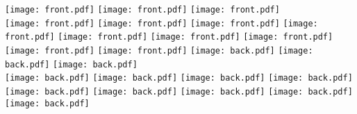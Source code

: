 \documentclass{article}
\begin{document}
 \noindent\texttt{[image: front.pdf]}
 \hspace{10mm}
 \texttt{[image: front.pdf]}
 \hspace{10mm}
 \texttt{[image: front.pdf]} \\
 \texttt{[image: front.pdf]}
 \hspace{10mm}
 \texttt{[image: front.pdf]}
 \hspace{10mm}
 \texttt{[image: front.pdf]}
 \texttt{[image: front.pdf]}
 \hspace{10mm}
 \texttt{[image: front.pdf]}
 \hspace{10mm}
 \texttt{[image: front.pdf]}
 \texttt{[image: front.pdf]}
 \hspace{10mm}
 \texttt{[image: front.pdf]}
 \hspace{10mm}
 \texttt{[image: front.pdf]}
\clearpage
 \noindent\texttt{[image: back.pdf]}
 \hspace{10mm}
 \texttt{[image: back.pdf]}
 \hspace{10mm}
 \texttt{[image: back.pdf]} \\
 \texttt{[image: back.pdf]}
 \hspace{10mm}
 \texttt{[image: back.pdf]}
 \hspace{10mm}
 \texttt{[image: back.pdf]}
 \texttt{[image: back.pdf]}
 \hspace{10mm}
 \texttt{[image: back.pdf]}
 \hspace{10mm}
 \texttt{[image: back.pdf]}
 \texttt{[image: back.pdf]}
 \hspace{10mm}
 \texttt{[image: back.pdf]}
 \hspace{10mm}
 \texttt{[image: back.pdf]}
\end{document}
